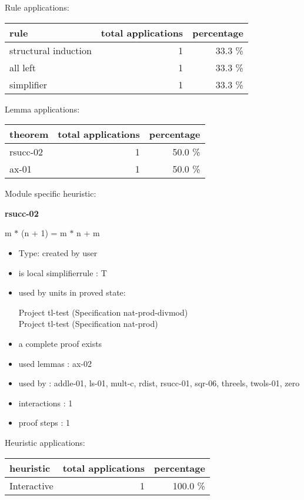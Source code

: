 \documentclass[a4paper]{article}
\begin{document}
Rule applications:

\begin{supertabular}{l|r|r}
rule	        & total applications & percentage \\ \hline
structural induction & 1 & 33.3 \% \\
all left & 1 & 33.3 \% \\
simplifier & 1 & 33.3 \% \\

\end{supertabular}

Lemma applications:

\begin{supertabular}{l|r|r}
theorem	        & total applications & percentage \\ \hline
rsucc-02 & 1 & 50.0 \% \\
ax-01 & 1 & 50.0 \% \\

\end{supertabular}

Module specific heuristic:

\pagebreak

{\LARGE\bf rsucc-02}\label{lemma-rsucc-02}

\medskip

 \Fol m $*$ (n + 1) = m $*$ n + m

\begin{itemize}

\item Type: created by user

\item is local simplifierrule : T
\item used by units in proved state:

Project tl-test (Specification nat-prod-divmod) \\
Project tl-test (Specification nat-prod)
\item       a complete proof exists
\item       used lemmas  : ax-02
\item       used by      : addle-01, ls-01, mult-c, rdist, rsucc-01, sqr-06, threels, twols-01, zero
\item       interactions : 1
\item       proof steps  : 1
\end{itemize}

\medskip


Heuristic applications:

\begin{supertabular}{l|r|r}
heuristic	& total applications & percentage \\ \hline
Interactive & 1 & 100.0 \% \\

\end{supertabular}
\end{document}
